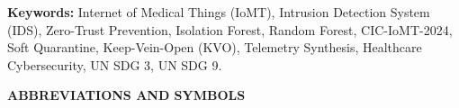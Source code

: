 \documentclass[12pt,a4paper]{report}
\begin{document}
\vspace{0.8cm}
\noindent
\textbf{Keywords:} Internet of Medical Things (IoMT), Intrusion Detection System (IDS), Zero-Trust Prevention, Isolation Forest, Random Forest, CIC-IoMT-2024, Soft Quarantine, Keep-Vein-Open (KVO), Telemetry Synthesis, Healthcare Cybersecurity, UN SDG 3, UN SDG 9.

\newpage
\tableofcontents

\newpage
\listoffigures

\newpage
\listoftables

\newpage
\begin{center}
    {\Large \bfseries ABBREVIATIONS AND SYMBOLS\par}
\end{center}
\vspace{0.8cm}
\end{document}
